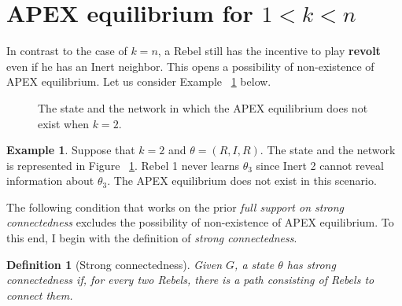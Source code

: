 \documentclass[12pt,letter]{article}
\newtheorem{definition}{Definition}[section]
\theoremstyle{definition}
\newtheorem{example}{Example}
\theoremstyle{remark}
\theoremstyle{claim}
\begin{document}
\section{APEX equilibrium for $1<k<n$}
\label{sec:equilibrium_2}

In contrast to the case of $k=n$, a Rebel still has the incentive to play \textbf{revolt} even if he has an Inert neighbor. This opens a possibility of non-existence of APEX equilibrium. Let us consider Example ~\ref{ex_strong_connectedness} below.

\begin{figure}



\begin{center}
\end{center}

\label{fig:strong_connectedness}
\caption{The state and the network in which the APEX equilibrium does not exist when $k=2$.}
\end{figure}

\begin{example}\label{ex_strong_connectedness}
Suppose that $k=2$ and $\theta=(R,I,R)$. The state and the network is represented in Figure ~\ref{fig:strong_connectedness}. Rebel 1 never learns $\theta_3$ since Inert 2 cannot reveal information about $\theta_3$. The APEX equilibrium does not exist in this scenario.
\end{example}

The following condition that works on the prior \textit{full support on strong connectedness} excludes the possibility of non-existence of APEX equilibrium. To this end, I begin with the definition of \textit{strong connectedness}.

\begin{definition}[Strong connectedness]
Given $G$, a state $\theta$ has strong connectedness if, for every two Rebels, there is a path consisting of Rebels to connect them.

\end{definition}  
\end{document}
